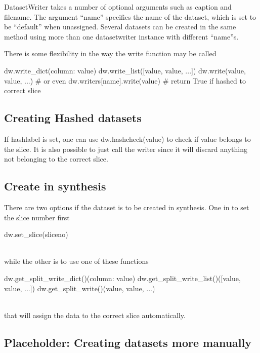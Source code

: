 DatasetWriter takes a number of optional arguments such as caption and
filename.  The argument ``name'' specifies the name of the dataset,
which is set to be ``default'' when unassigned.  Several datasets can
be created in the same method using more than one datasetwriter
instance with different ``name''s.

There is some flexibility in the way the write function may be called

\begin{python}
  dw.write_dict({column: value})
  dw.write_list([value, value, ...])
  dw.write(value, value, ...)
  # or even
  dw.writers[name].write(value)  # return True if hashed to correct slice
\end{python}



\subsection{Creating Hashed datasets}

If hashlabel is set, one can use dw.hashcheck(value) to check if value
belongs to the slice.  It is also possible to just call the writer
since it will discard anything not belonging to the correct slice.



\subsection{Create in synthesis}

There are two options if the dataset is to be created in synthesis.
One in to set the slice number first

\begin{python}
  dw.set_slice(sliceno)
\end{python}
\\
while the other is to use one of these functions

\begin{python}
  dw.get_split_write_dict()({column: value})
  dw.get_split_write_list()([value, value, ...])
  dw.get_split_write()(value, value, ...)
\end{python}
\\
that will assign the data to the correct slice automatically.

\subsection{Placeholder:  Creating datasets more manually}


